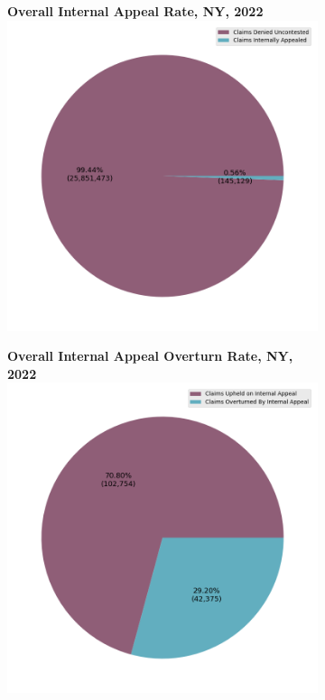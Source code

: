 \documentclass[12pt, a4paper,twoside]{report}
\theoremstyle{plain} %
\theoremstyle{definition} %
\theoremstyle{remark} %
\numberwithin{equation}{chapter}
\begin{document}
		
		\begin{figure}[h!]
			\centering
			\begin{subfigure}[b]{0.49\textwidth}
				\centering
				\textbf{Overall Internal Appeal Rate, NY, 2022}
				\includegraphics[width=\textwidth]{images/ny_claim_reports/internal_appeal_pie.png}
			\end{subfigure}
			\hfill
			\begin{subfigure}[b]{0.49\textwidth}
				\centering
				\textbf{Overall Internal Appeal Overturn Rate, NY, 2022}
				\includegraphics[width=\textwidth]{images/ny_claim_reports/internal_appeal_overturns_pie.png}

\end{subfigure}
\end{figure}
\end{document}
